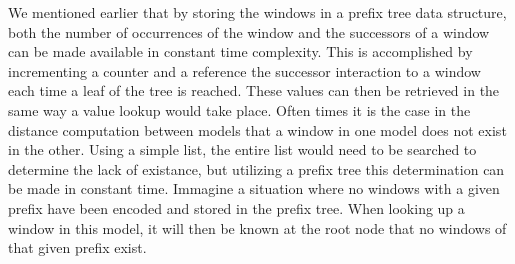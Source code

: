 
We mentioned earlier that
by storing the windows in a prefix tree data structure,
both 
the number of occurrences of the window and
the successors of a window
can be made available in
constant time complexity.
%
This is accomplished by
incrementing a counter and 
a reference the successor interaction to a window 
each time a leaf of the tree is reached.
%
These values can then be retrieved
in the same way a value 
lookup would take place.
%
Often times it is the case 
in the distance computation between models
that a window in one model does not exist in the other.
Using a simple list,
the entire list would need to be searched to determine
the lack of existance, but
utilizing a prefix tree this determination can be made
in constant time.
%
Immagine a situation where
no windows with a given prefix
have been encoded and stored in the prefix tree.
When looking up a window in this model,
it will then be known at the root node that
no windows of that given prefix exist. 


